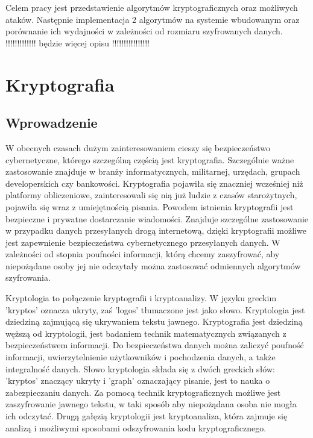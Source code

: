 \documentclass[12p]{article}
\begin{document}
\tableofcontents
\newpage
\quad Celem pracy jest przedstawienie algorytmów kryptograficznych oraz możliwych ataków. Następnie implementacja 2 algorytmów na systemie wbudowanym oraz porównanie ich wydajności w zależności od rozmiaru szyfrowanych danych.
\newline
\newline
!!!!!!!!!!!!! będzie więcej opisu !!!!!!!!!!!!!!!!

\newpage
\section{Kryptografia}
\subsection{Wprowadzenie}

\quad W obecnych czasach dużym zainteresowaniem cieszy się bezpieczeństwo cybernetyczne, którego szczególną częścią jest kryptografia. Szczególnie ważne zastosowanie znajduje w branży informatycznych, militarnej, urzędach, grupach developerskich czy bankowości. Kryptografia pojawiła się znaczniej wcześniej niż platformy obliczeniowe, zainteresowali się nią już ludzie z czasów starożytnych, pojawiła się wraz z umiejętnością pisania. Powodem istnienia kryptografii jest bezpieczne i prywatne dostarczanie wiadomości. Znajduje szczególne zastosowanie w przypadku danych przesyłanych drogą internetową, dzięki kryptografii możliwe jest zapewnienie bezpieczeństwa cybernetycznego przesyłanych danych. W zależności od stopnia poufności informacji, którą chcemy zaszyfrować, aby niepożądane osoby jej nie odczytały można zastosować odmiennych algorytmów szyfrowania. 

\quad Kryptologia to połączenie kryptografii i kryptoanalizy. W języku greckim 'kryptos' oznacza ukryty, zaś 'logos' tłumaczone jest jako słowo. Kryptologia jest dziedziną zajmującą się ukrywaniem tekstu jawnego. Kryptografia jest dziedziną węższą od kryptologii, jest badaniem technik matematycznych związanych z bezpieczeństwem informacji. Do bezpieczeństwa danych można zaliczyć poufność informacji, uwierzytelnienie użytkowników i pochodzenia danych, a także integralność danych. Słowo kryptologia składa się z dwóch greckich słów: 'kryptos' znaczący ukryty i 'graph' oznaczający pisanie, jest to nauka o zabezpieczaniu danych. Za pomocą technik kryptograficznych możliwe jest zaszyfrowanie jawnego tekstu, w taki sposób aby niepożądana osoba nie mogła ich odczytać. Drugą gałęzią kryptologii jest kryptoanaliza, która zajmuje się analizą i możliwymi sposobami odszyfrowania kodu kryptograficznego.
\end{document}
